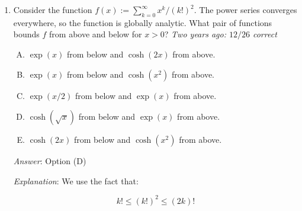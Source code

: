 \documentclass[10pt]{amsart}
\begin{document}
\begin{enumerate}
  {\em Answer}: Option (B)

  {\em Explanation}: Note that {\em any} power series with infinitely
  many positive coefficients (and no negative coefficients) must grow
  faster than a polynomial, which, after all, has finite degree. Note
  that this logic does not work for power series that have a mix of
  positive and negative coefficients, such as the power series for the
  $\sin$ and $\cos$ functions.

  The rough reason that growth is strictly slower than an exponential
  function is that the denominators are growing much faster than
  $k!$. Recall that if the denominators are $k!$, we get precisely the
  exponential function. This can be made more precise.

  {\em Performance review}: $18$ out of $24$ got this. $4$ chose (C),
  $1$ each chose (A) and (E).

  {\em Historical note (Math 153)}: $30$ out of $40$ got this. $5$ chose (A),
  $3$ chose (C), $1$ each chose (D) and (E).

  {\em Historical note (last year)}: $5$ out of $11$ got this correct. $4$
  chose (D), $1$ each chose (A) and (C).

  {\em Historical note (two years ago)}: $12$ out of $26$ people got this
  correct. $6$ chose (D), $4$ chose (C), $2$ each chose (A) and (E).

\item Consider the function $f(x) := \sum_{k=0}^\infty
  x^k/(k!)^2$. The power series converges everywhere, so the function
  is globally analytic. What pair of functions bounds $f$ from above
  and below for $x > 0$? {\em Two years ago: $12/26$ correct}

  \begin{enumerate}[(A)]
  \item $\exp(x)$ from below and $\cosh(2x)$ from above.
  \item $\exp(x)$ from below and $\cosh(x^2)$ from above.
  \item $\exp(x/2)$ from below and $\exp(x)$ from above.
  \item $\cosh(\sqrt{x})$ from below and $\exp(x)$ from above.
  \item $\cosh(2x)$ from below and $\cosh(x^2)$ from above.
  \end{enumerate}


  {\em Answer}: Option (D)

  {\em Explanation}: We use the fact that:

  $$k! \le (k!)^2 \le (2k)!$$


\end{enumerate}
\end{document}

